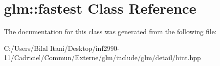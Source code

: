 \hypertarget{classglm_1_1fastest}{}\section{glm\+:\+:fastest Class Reference}
\label{classglm_1_1fastest}


The documentation for this class was generated from the following file\+:\begin{DoxyCompactItemize}
\item 
C\+:/\+Users/\+Bilal Itani/\+Desktop/inf2990-\/11/\+Cadriciel/\+Commun/\+Externe/glm/include/glm/detail/hint.\+hpp\end{DoxyCompactItemize}

